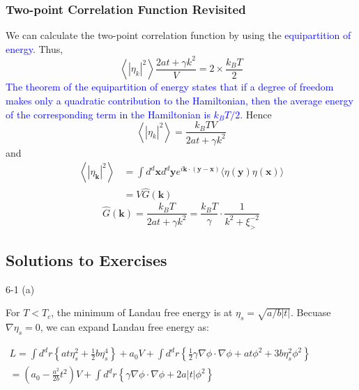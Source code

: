 \documentclass[12pt,titlepage]{article}
\newcommand{\bluep}[1]{\textcolor{blue}{#1}}
\numberwithin{equation}{section}
\begin{document}
\subsubsection{Two-point Correlation Function Revisited}
We can calculate the two-point correlation function by using the \bluep{equipartition of energy}. Thus,
\begin{equation}
\left\langle\left|\eta_{k}\right|^{2}\right\rangle \frac{2 a t+\gamma k^{2}}{V}=2 \times \frac{k_{B} T}{2}
\end{equation}
\bluep{The theorem of the equipartition of energy states that if a degree of freedom makes only a quadratic contribution to the Hamiltonian, then the average energy of the corresponding term in the Hamiltonian is $k_BT/2$.} Hence
\begin{equation}
\left\langle\left|\eta_{k}\right|^{2}\right\rangle=\frac{k_{B} T V}{2 a t+\gamma k^{2}}
\end{equation}
and 
\begin{equation}
\begin{aligned}\left\langle\left|\eta_{\mathbf{k}}\right|^{2}\right\rangle &=\int d^{d} \mathbf{x} d^{d} \mathbf{y} e^{i \mathbf{k} \cdot(\mathbf{y}-\mathbf{x})}\langle\eta(\mathbf{y}) \eta(\mathbf{x})\rangle \\ &= V \hat{G}(\mathbf{k}) \end{aligned}
\end{equation}
\begin{equation}
\hat{G}(\mathbf{k})=\frac{k_{B} T}{2 a t+\gamma k^{2}}=\frac{k_{B} T}{\gamma} \cdot \frac{1}{k^{2}+\xi_{>}^{-2}}
\end{equation}

\subsection{Solutions to Exercises}
6-1 (a)

For $\displaystyle T< T_{c}$, the minimum of Landau free energy is at $\displaystyle \eta _{s} =\sqrt{a/b| t|}$. Becuase $\displaystyle \nabla \eta _{s} =0$, we can expand Landau free energy as:

$\displaystyle  \begin{array}{l}
L=\int d^{d} r\left\{at\eta ^{2}_{s} +\frac{1}{2} b\eta ^{4}_{s}\right\} +a_{0} V+\int d^{d} r\left\{\frac{1}{2} \gamma \nabla \phi \cdot \nabla \phi +at\phi ^{2} +3b\eta ^{2}_{s} \phi ^{2}\right\}\\
=\left( a_{0} -\frac{a^{2}}{2b} t^{2}\right) V+\int d^{d} r\left\{\gamma \nabla \phi \cdot \nabla \phi +2a|t|\phi ^{2}\right\}
\end{array}$
\end{document}
